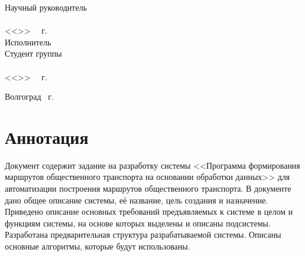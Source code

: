 \begin{minipage}[t]{0.39\textwidth}
    \begin{flushleft}
        Научный руководитель\\
        \underline{}\\
        <<\LINE{1.5em}>>\ \LINE{7em} \the\year\ г.\\
        Исполнитель\\
        Студент группы\\
        \underline{}\\
        <<\LINE{1.5em}>>\ \LINE{7em} \the\year\ г.\\
    \end{flushleft}
\end{minipage}
\vspace{\fill}
\begin{center}
    Волгоград \the\year\ г.
\end{center}
\newpage

\tocless\part{Аннотация}
Документ содержит задание на разработку системы <<Программа формирования маршрутов общественного транспорта 
на основании обработки данных>> для автоматизации построения маршрутов общественного транспорта. В документе 
дано общее описание системы, её название, цель создания и назначение. Приведено описание основных требований 
предъявляемых к системе в целом и функциям системы, на основе которых выделены и описаны подсистемы. 
Разработана предварительная структура разрабатываемой системы. Описаны основные алгоритмы, которые будут 
использованы.
\newpage

\startcontents[sections]
\begin{changemargin}{-0.5cm}{0pt}
\end{changemargin}

\newpage

% 
%

